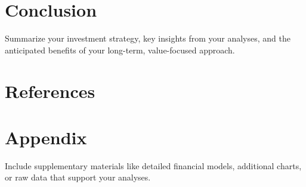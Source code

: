 \documentclass[12pt]{report}
\begin{document}
\chapter{Conclusion}
Summarize your investment strategy, key insights from your analyses, and the anticipated benefits of your long-term, value-focused approach.

\chapter{References}



\appendix
\chapter{Appendix}
Include supplementary materials like detailed financial models, additional charts, or raw data that support your analyses.
\end{document}

